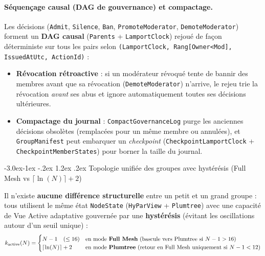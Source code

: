 \documentclass[11pt,a4paper]{article}
\makeatletter
\renewcommand\subsection{\@startsection{subsection}{2}{\z@}%
                                     {-3.0ex\@plus -1ex \@minus -.2ex}%
                                     {1.2ex \@plus .2ex}%
                                     {\normalfont\large\bfseries\color{PrimaryBlue}}}
\makeatother
\begin{document}
\paragraph{Séquençage causal (DAG de gouvernance) et compactage.}
Les décisions (\texttt{Admit}, \texttt{Silence}, \texttt{Ban}, \texttt{PromoteModerator}, \texttt{DemoteModerator}) forment un \textbf{DAG causal} (\texttt{Parents} + \texttt{LamportClock}) rejoué de façon déterministe sur tous les pairs selon \texttt{(LamportClock, Rang[Owner<Mod], IssuedAtUtc, ActionId)} :
\begin{itemize}
    \item \textbf{Révocation rétroactive} : si un modérateur révoqué tente de bannir des membres avant que sa révocation (\texttt{DemoteModerator}) n'arrive, le rejeu trie la révocation \emph{avant} ses abus et ignore automatiquement toutes ses décisions ultérieures.
    \item \textbf{Compactage du journal} : \texttt{CompactGovernanceLog} purge les anciennes décisions obsolètes (remplacées pour un même membre ou annulées), et \texttt{GroupManifest} peut embarquer un \emph{checkpoint} (\texttt{CheckpointLamportClock} + \texttt{CheckpointMemberStates}) pour borner la taille du journal.
\end{itemize}

\subsection{Topologie unifiée des groupes avec hystérésis (Full Mesh vs $\lceil \ln(N) \rceil + 2$)}

Il n'existe \textbf{aucune différence structurelle} entre un petit et un grand groupe : tous utilisent le même état \texttt{NodeState} (\texttt{HyParView} + \texttt{Plumtree}) avec une capacité de Vue Active adaptative gouvernée par une \textbf{hystérésis} (évitant les oscillations autour d'un seuil unique) :
\[
k_{\text{active}}(N) =
\begin{cases}
N - 1 \quad (\le 16) & \text{en mode \textbf{Full Mesh} (bascule vers Plumtree si } N - 1 > 16\text{)} \\
\lceil \ln(N) \rceil + 2 & \text{en mode \textbf{Plumtree} (retour en Full Mesh uniquement si } N - 1 < 12\text{)}
\end{cases}
\]
\end{document}
